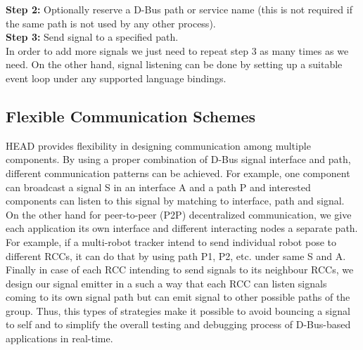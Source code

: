 \documentclass[draft]{ifacconf}
\begin{document}
\textbf{Step 2:} Optionally reserve a D-Bus path or service name (this is not required if the same path is not used by any other process).\\
\textbf{Step 3:} Send signal to a specified path. \\
In order to add more signals we just need to repeat step 3 as many times as we need. On the other hand, signal listening can be done by setting up a suitable event loop under any supported language bindings.
\subsection{Flexible Communication  Schemes}
HEAD provides flexibility in designing communication among multiple components. By using a proper combination of D-Bus signal interface and path, different communication patterns can be achieved. For example, one component can broadcast a signal S in an interface A and a path P and interested components can listen to this signal by matching to interface, path and signal. On the other hand for peer-to-peer (P2P) decentralized communication,  we give each application its own interface and different interacting nodes a separate path.  For example, if a multi-robot tracker intend to send individual robot pose to different RCCs, it can do that by using path P1,  P2, etc. under same S and A. Finally in case of each RCC intending to send signals to its neighbour RCCs, we design our signal emitter in a such a way that each RCC can listen signals coming to its own signal path but can emit  signal to other possible paths of the group. Thus,  this types of strategies  make it possible to avoid bouncing a signal to self and to simplify the overall testing and debugging process of D-Bus-based applications in real-time. 
\end{document}
